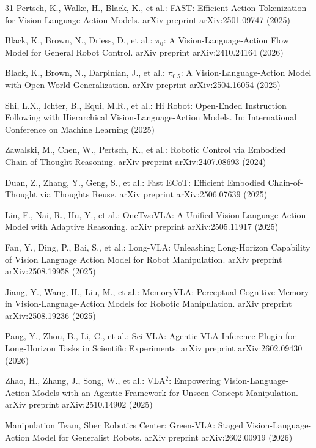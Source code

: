 \documentclass[a4paper]{Template/LaTeX_Templates/waica}
\begin{document}
\begin{thebibliography}{31}
Pertsch, K., Walke, H., Black, K., et al.: FAST: Efficient Action Tokenization for Vision-Language-Action Models. arXiv preprint arXiv:2501.09747 (2025)

Black, K., Brown, N., Driess, D., et al.: $\pi_0$: A Vision-Language-Action Flow Model for General Robot Control. arXiv preprint arXiv:2410.24164 (2026)

Black, K., Brown, N., Darpinian, J., et al.: $\pi_{0.5}$: A Vision-Language-Action Model with Open-World Generalization. arXiv preprint arXiv:2504.16054 (2025)

Shi, L.X., Ichter, B., Equi, M.R., et al.: Hi Robot: Open-Ended Instruction Following with Hierarchical Vision-Language-Action Models. In: International Conference on Machine Learning (2025)

Zawalski, M., Chen, W., Pertsch, K., et al.: Robotic Control via Embodied Chain-of-Thought Reasoning. arXiv preprint arXiv:2407.08693 (2024)

Duan, Z., Zhang, Y., Geng, S., et al.: Fast ECoT: Efficient Embodied Chain-of-Thought via Thoughts Reuse. arXiv preprint arXiv:2506.07639 (2025)

Lin, F., Nai, R., Hu, Y., et al.: OneTwoVLA: A Unified Vision-Language-Action Model with Adaptive Reasoning. arXiv preprint arXiv:2505.11917 (2025)

Fan, Y., Ding, P., Bai, S., et al.: Long-VLA: Unleashing Long-Horizon Capability of Vision Language Action Model for Robot Manipulation. arXiv preprint arXiv:2508.19958 (2025)

Jiang, Y., Wang, H., Liu, M., et al.: MemoryVLA: Perceptual-Cognitive Memory in Vision-Language-Action Models for Robotic Manipulation. arXiv preprint arXiv:2508.19236 (2025)

Pang, Y., Zhou, B., Li, C., et al.: Sci-VLA: Agentic VLA Inference Plugin for Long-Horizon Tasks in Scientific Experiments. arXiv preprint arXiv:2602.09430 (2026)

Zhao, H., Zhang, J., Song, W., et al.: VLA$^2$: Empowering Vision-Language-Action Models with an Agentic Framework for Unseen Concept Manipulation. arXiv preprint arXiv:2510.14902 (2025)

Manipulation Team, Sber Robotics Center: Green-VLA: Staged Vision-Language-Action Model for Generalist Robots. arXiv preprint arXiv:2602.00919 (2026)


\end{thebibliography}
\end{document}
